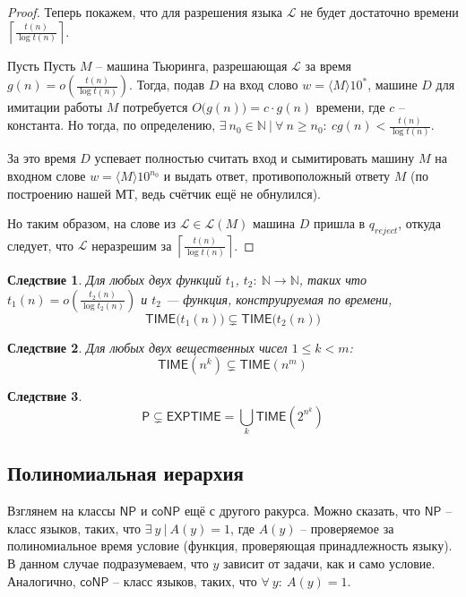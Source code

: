 \documentclass[a4paper,12pt]{article}
\newcommand{\Pclass}{\mathsf{P}}
\newcommand{\NPclass}{\mathsf{NP}}
\newcommand{\coNPclass}{\mathsf{coNP}}
\newcommand{\Time}{\mathsf{TIME}}
\newcommand{\ETime}{\mathsf{EXPTIME}}
\newtheorem{consequence}{Следствие}
\newcommand{\N}{\mathbb{N}}
\renewcommand{\L}{\mathscr{L}}
\begin{document}
\begin{proof}
    Теперь покажем, что для разрешения языка $\L$ не будет достаточно времени $\left\lceil \frac{t(n)}{\log t(n)}\right\rceil$.
    
    Пусть Пусть $M$ -- машина Тьюринга, разрешающая $\L$ за время $g(n) = o\left(\frac{t(n)}{\log t(n)}\right)$. Тогда, подав $D$ на вход слово $w = \langle M\rangle 10^*$, машине $D$ для имитации работы $M$ потребуется $O\big(g(n)\big) = c\cdot g(n)$ времени, где $c$ -- константа. Но тогда, по определению, $\exists\ n_0 \in \N\ |\ \forall\ n\geq n_0:\ cg(n) < \frac{t(n)}{\log t(n)}$. 
    
    За это время $D$ успевает полностью считать вход и сымитировать машину $M$ на входном слове $w = \langle M\rangle 10^{n_0}$ и выдать ответ, противоположный ответу $M$ (по построению нашей МТ, ведь счётчик ещё не обнулился).
    
    Но таким образом, на слове из $\L \in \L(M)$ машина $D$ пришла в $q_{reject}$, откуда следует, что $\L$ неразрешим за $\left\lceil \frac{t(n)}{\log t(n)}\right\rceil$.
    
\end{proof}
\begin{consequence}
Для любых двух функций $t_1$, $t_2:\ \N \to \N$, таких что $t_1(n) =
o\left(\frac{t_2(n)}{\log t_2(n)}\right)$ и $t_2$ — функция, конструируемая по времени,\[\Time\big(t_1(n)\big) \subsetneq \Time\big(t_2(n)\big)\]
\end{consequence}
\begin{consequence}
Для любых двух вещественных чисел $1 \leq k < m$:
\[\Time(n^k) \subsetneq \Time(n^m)\]
\end{consequence}
\begin{consequence}
\[\Pclass \subsetneq \ETime = \bigcup\limits_k\Time(2^{n^k})\]
\end{consequence}

\subsection{Полиномиальная иерархия}

Взглянем на классы $\NPclass$ и $\coNPclass$ ещё с другого ракурса. Можно сказать, что $\NPclass$ -- класс языков, таких, что $\exists\ y\ |\ A(y) = 1$, где $A(y)$ -- проверяемое за полиномиальное время условие (функция, проверяющая принадлежность языку). В данном случае подразумеваем, что $y$ зависит от задачи, как и само условие. Аналогично, $\coNPclass$ -- класс языков, таких, что $\forall\ y:\ A(y) = 1$.
\end{document}
